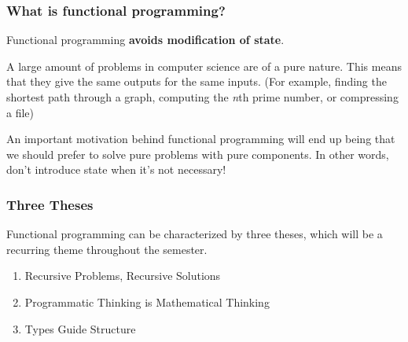 \documentclass[aspectratio=169]{beamer}
\begin{document}
\begin{frame}[fragile]
  \frametitle{What is functional programming?}

  Functional programming \textbf{avoids modification of state}.

  \pause
  \vspace{\fill}


  \pause
  \vspace{\fill}

  A large amount of problems in computer science are of a pure nature. This means that they
  give the same outputs for the same inputs.
  (For example, finding the shortest path through a graph, computing the \textit{n}th prime
  number, or compressing a file)

  \pause
  \vspace{5pt}

  An important motivation behind functional programming will end up being that we should 
  prefer to solve pure problems with pure components. In other words, don't introduce state
  when it's not necessary!
\end{frame}

\begin{frame}[fragile]
  \frametitle{Three Theses}
  \vspace{\fill}

  Functional programming can be characterized by three theses, which will be a recurring
  theme throughout the semester. 

  \pause 

  \vspace{\fill}

  { \Large
  \begin{enumerate}
    \item Recursive Problems, Recursive Solutions
    \pause
    \vspace{\fill}
    \item Programmatic Thinking is Mathematical Thinking
    \pause
    \vspace{\fill}
    \item Types Guide Structure
  \end{enumerate}
  }

\end{frame}
\end{document}
